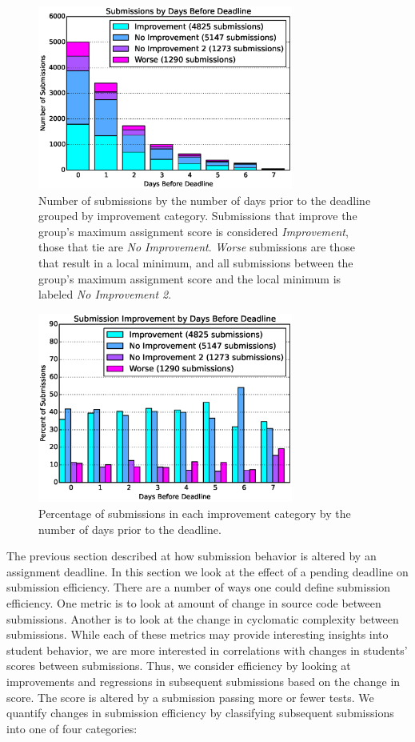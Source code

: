 \begin{figure}[!t]
\centering \includegraphics[width=3.3in]{graphs/Submissions_by_Days_Before_Deadline.eps}
\caption{Number of submissions by the number of days prior to the deadline
  grouped by improvement category.  Submissions that improve the group's
  maximum assignment score is considered \emph{Improvement}, those that tie are
  \emph{No Improvement}. \emph{Worse} submissions are those that result in a
  local minimum, and all submissions between the group's maximum assignment
  score and the local minimum is labeled \emph{No Improvement 2}.}
\end{figure}

\begin{figure}[!t]
\centering \includegraphics[width=3.3in]{graphs/Submission_Improvement_by_Days_Before_Deadline.eps}
\caption{Percentage of submissions in each improvement category by the number
  of days prior to the deadline.}
\end{figure}

The previous section described at how submission behavior is altered by an
assignment deadline. In this section we look at the effect of a pending
deadline on submission efficiency. There are a number of ways one could define
submission efficiency. One metric is to look at amount of change in source code
between submissions. Another is to look at the change in cyclomatic complexity
between submissions. While each of these metrics may provide interesting
insights into student behavior, we are more interested in correlations with
changes in students' scores between submissions. Thus, we consider efficiency
by looking at improvements and regressions in subsequent submissions based on
the change in score. The score is altered by a submission passing more or fewer
tests. We quantify changes in submission efficiency by classifying subsequent
submissions into one of four categories:

